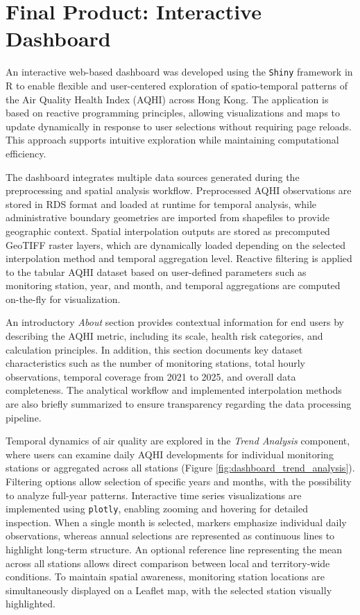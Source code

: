 \documentclass[manuscript,nonacm]{acmart}
\begin{document}
    \section{Final Product: Interactive Dashboard}

        An interactive web-based dashboard was developed using the \texttt{Shiny} framework in R to enable flexible and user-centered exploration of spatio-temporal patterns of the Air Quality Health Index (AQHI) across Hong Kong. The application is based on reactive programming principles, allowing visualizations and maps to update dynamically in response to user selections without requiring page reloads. This approach supports intuitive exploration while maintaining computational efficiency.

        The dashboard integrates multiple data sources generated during the preprocessing and spatial analysis workflow. Preprocessed AQHI observations are stored in RDS format and loaded at runtime for temporal analysis, while administrative boundary geometries are imported from shapefiles to provide geographic context. Spatial interpolation outputs are stored as precomputed GeoTIFF raster layers, which are dynamically loaded depending on the selected interpolation method and temporal aggregation level. Reactive filtering is applied to the tabular AQHI dataset based on user-defined parameters such as monitoring station, year, and month, and temporal aggregations are computed on-the-fly for visualization.

        An introductory \emph{About} section provides contextual information for end users by describing the AQHI metric, including its scale, health risk categories, and calculation principles. In addition, this section documents key dataset characteristics such as the number of monitoring stations, total hourly observations, temporal coverage from 2021 to 2025, and overall data completeness. The analytical workflow and implemented interpolation methods are also briefly summarized to ensure transparency regarding the data processing pipeline.

        Temporal dynamics of air quality are explored in the \emph{Trend Analysis} component, where users can examine daily AQHI developments for individual monitoring stations or aggregated across all stations (Figure \ref{fig:dashboard_trend_analysis}). Filtering options allow selection of specific years and months, with the possibility to analyze full-year patterns. Interactive time series visualizations are implemented using \texttt{plotly}, enabling zooming and hovering for detailed inspection. When a single month is selected, markers emphasize individual daily observations, whereas annual selections are represented as continuous lines to highlight long-term structure. An optional reference line representing the mean across all stations allows direct comparison between local and territory-wide conditions. To maintain spatial awareness, monitoring station locations are simultaneously displayed on a Leaflet map, with the selected station visually highlighted.
\end{document}

